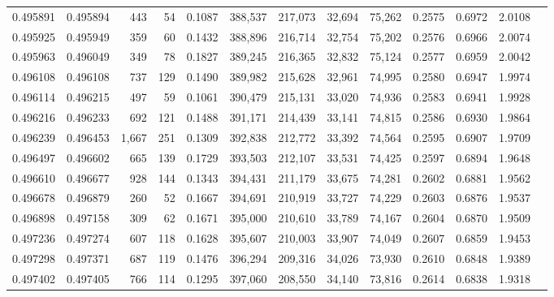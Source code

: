 \begin{tabular}{rrrrrrrrrrrrr}
0.495891 & 0.495894 &   443 &    54 &                                     0.1087 & 388,537 & 217,073 &  32,694 &  75,262 & 0.2575 & 0.6972 & 2.0108 \\
0.495925 & 0.495949 &   359 &    60 &                                     0.1432 & 388,896 & 216,714 &  32,754 &  75,202 & 0.2576 & 0.6966 & 2.0074 \\
0.495963 & 0.496049 &   349 &    78 &                                     0.1827 & 389,245 & 216,365 &  32,832 &  75,124 & 0.2577 & 0.6959 & 2.0042 \\
0.496108 & 0.496108 &   737 &   129 &                                     0.1490 & 389,982 & 215,628 &  32,961 &  74,995 & 0.2580 & 0.6947 & 1.9974 \\
0.496114 & 0.496215 &   497 &    59 &                                     0.1061 & 390,479 & 215,131 &  33,020 &  74,936 & 0.2583 & 0.6941 & 1.9928 \\
0.496216 & 0.496233 &   692 &   121 &                                     0.1488 & 391,171 & 214,439 &  33,141 &  74,815 & 0.2586 & 0.6930 & 1.9864 \\
0.496239 & 0.496453 & 1,667 &   251 &                                     0.1309 & 392,838 & 212,772 &  33,392 &  74,564 & 0.2595 & 0.6907 & 1.9709 \\
0.496497 & 0.496602 &   665 &   139 &                                     0.1729 & 393,503 & 212,107 &  33,531 &  74,425 & 0.2597 & 0.6894 & 1.9648 \\
0.496610 & 0.496677 &   928 &   144 &                                     0.1343 & 394,431 & 211,179 &  33,675 &  74,281 & 0.2602 & 0.6881 & 1.9562 \\
0.496678 & 0.496879 &   260 &    52 &                                     0.1667 & 394,691 & 210,919 &  33,727 &  74,229 & 0.2603 & 0.6876 & 1.9537 \\
0.496898 & 0.497158 &   309 &    62 &                                     0.1671 & 395,000 & 210,610 &  33,789 &  74,167 & 0.2604 & 0.6870 & 1.9509 \\
0.497236 & 0.497274 &   607 &   118 &                                     0.1628 & 395,607 & 210,003 &  33,907 &  74,049 & 0.2607 & 0.6859 & 1.9453 \\
0.497298 & 0.497371 &   687 &   119 &                                     0.1476 & 396,294 & 209,316 &  34,026 &  73,930 & 0.2610 & 0.6848 & 1.9389 \\
0.497402 & 0.497405 &   766 &   114 &                                     0.1295 & 397,060 & 208,550 &  34,140 &  73,816 & 0.2614 & 0.6838 & 1.9318 \\

\end{tabular}
